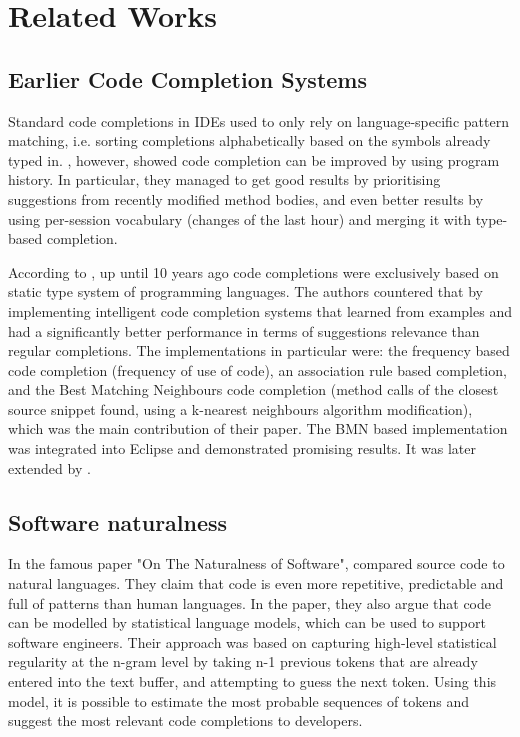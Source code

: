 \chapter{Related Works}
\label{chap:Related Works}

\section{Earlier Code Completion Systems}
Standard code completions in IDEs used to only rely on language-specific pattern matching, i.e. sorting completions alphabetically based on the symbols already typed in. \cite{Robb08a}, however, showed code completion can be improved by using program history. In particular, they managed to get good results by prioritising suggestions from recently modified method bodies, and even better results by using per-session vocabulary (changes of the last hour) and merging it with type-based completion.

According to \cite{Bruc09a}, up until 10 years ago code completions were exclusively based on static type system of programming languages. The authors countered that by implementing intelligent code completion systems that learned from examples and had a significantly better performance in terms of suggestions relevance than regular completions. The implementations in particular were: the frequency based code completion (frequency of use of code), an association rule based completion, and the Best Matching Neighbours code completion (method calls of the closest source snippet found, using a k-nearest neighbours algorithm modification), which was the main contribution of their paper. The BMN based implementation was integrated into Eclipse and demonstrated promising results. It was later extended by \cite{Prok15a}.

\section{Software naturalness}
In the famous paper "On The Naturalness of Software", \cite{Hind12a} compared source code to natural languages. They claim that code is even more repetitive, predictable and full of patterns than human languages. In the paper, they also argue that code can be modelled by statistical language models, which can be used to support software engineers. Their approach was based on capturing high-level statistical regularity at the n-gram level by taking n-1 previous tokens that are already entered into the text buffer, and attempting to guess the next token. Using this model, it is possible to estimate the most probable sequences of tokens and suggest the most relevant code completions to developers.

